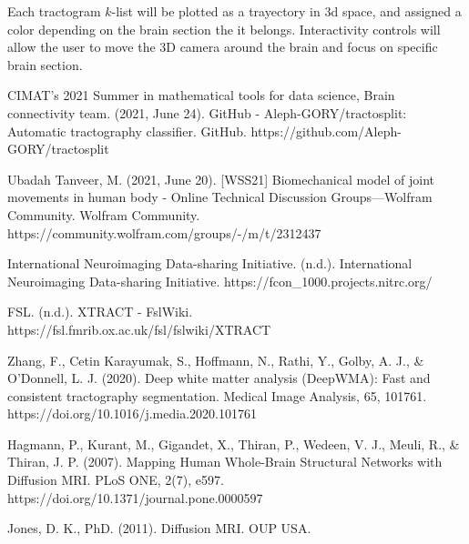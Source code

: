 \documentclass[conference]{IEEEtran}
\begin{document}
Each tractogram $k$-list will be plotted as a trayectory in 3d space, and assigned a color depending on the brain section the it belongs. Interactivity controls will allow the user to move the 3D camera around the brain and focus on specific brain section.

\newpage
%
%
\begin{thebibliography}{00}
     CIMAT’s 2021 Summer in mathematical tools for data science, Brain connectivity team. (2021, June 24). GitHub - Aleph-GORY/tractosplit: Automatic tractography classifier. GitHub. https://github.com/Aleph-GORY/tractosplit

     Ubadah Tanveer, M. (2021, June 20). [WSS21] Biomechanical model of joint movements in human body - Online Technical Discussion Groups—Wolfram Community. Wolfram Community. https://community.wolfram.com/groups/-/m/t/2312437

     International Neuroimaging Data-sharing Initiative. (n.d.). International Neuroimaging Data-sharing Initiative. https://fcon\_1000.projects.nitrc.org/

     FSL. (n.d.). XTRACT - FslWiki. \\https://fsl.fmrib.ox.ac.uk/fsl/fslwiki/XTRACT

     Zhang, F., Cetin Karayumak, S., Hoffmann, N., Rathi, Y., Golby, A. J., \& O’Donnell, L. J. (2020). Deep white matter analysis (DeepWMA): Fast and consistent tractography segmentation. Medical Image Analysis, 65, 101761. https://doi.org/10.1016/j.media.2020.101761

     Hagmann, P., Kurant, M., Gigandet, X., Thiran, P., Wedeen, V. J., Meuli, R., \& Thiran, J. P. (2007). Mapping Human Whole-Brain Structural Networks with Diffusion MRI. PLoS ONE, 2(7), e597. https://doi.org/10.1371/journal.pone.0000597

     Jones, D. K., PhD. (2011). Diffusion MRI. OUP USA.
\end{thebibliography}
\end{document}
